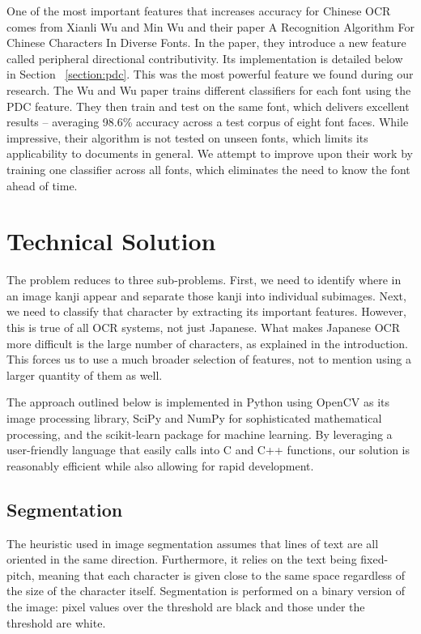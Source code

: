 \documentclass[10pt,twocolumn,letterpaper]{article}
\begin{document}
One of the most important features that increases accuracy for Chinese OCR comes from Xianli Wu and Min Wu and their paper A Recognition Algorithm For Chinese Characters In Diverse Fonts. In the paper, they introduce a new feature called peripheral directional contributivity. Its implementation is detailed below in Section ~\ref{section:pdc}. This was the most powerful feature we found during our research. The Wu and Wu paper trains different classifiers for each font using the PDC feature. They then train and test on the same font, which delivers excellent results -- averaging 98.6\% accuracy across a test corpus of eight font faces. While impressive, their algorithm is not tested on unseen fonts, which limits its applicability to documents in general. We attempt to improve upon their work by training one classifier across all fonts, which eliminates the need to know the font ahead of time.

\section{Technical Solution}
The problem reduces to three sub-problems. First, we need to identify where in an image kanji appear and separate those kanji into individual subimages. Next, we need to classify that character by extracting its important features. However, this is true of all OCR systems, not just Japanese. What makes Japanese OCR more difficult is the large number of characters, as explained in the introduction. This forces us to use a much broader selection of features, not to mention using a larger quantity of them as well.

The approach outlined below is implemented in Python using OpenCV as its image processing library, SciPy and NumPy for sophisticated mathematical processing, and the scikit-learn package for machine learning. By leveraging a user-friendly language that easily calls into C and C++ functions, our solution is reasonably efficient while also allowing for rapid development.


\subsection{Segmentation}
The heuristic used in image segmentation assumes that lines of text are all oriented in the same direction. Furthermore, it relies on the text being fixed-pitch, meaning that each character is given close to the same space regardless of the size of the character itself. Segmentation is performed on a binary version of the image: pixel values over the threshold are black and those under the threshold are white.
\end{document}
